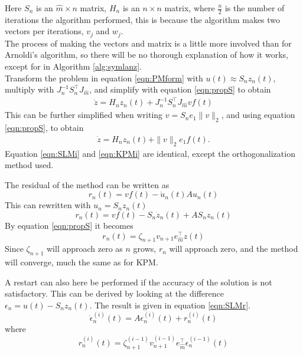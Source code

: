 Here $S_n$ is an $\hat{m} \times n $ matrix, $H_n$ is an $ n \times n $ matrix, where $\frac{n}{2}$ is the number of iterations the algorithm performed, this is because the algorithm makes two vectors per iterations, $v_j$ and $w_j$. \\

The process of making the vectors and matrix is a little more involved than for Arnoldi's algorithm, so there will be no thorough explanation of how it works, except for in Algorithm \ref{alg:symlanz}.\\

Transform the problem in equation \eqref{eqn:PMform} with $u(t) \approx S_n z_n(t)$, multiply with $J^{-1}_n S_n^\top J_{ \hat{m} }$, and simplify with equation \eqref{eqn:propS} to obtain
\begin{equation}
\begin{aligned}
\dot{z} = H_n z_n(t) + J_n^{-1} S_n^\top J_{\hat{m}} v f(t)
\end{aligned}
\label{eqn:SLMi}
\end{equation}
This can be further simplified when writing $ v = S_n e_1 \| v \|_2 $, and using equation \eqref{eqn:propS}, to obtain
\begin{equation}
\begin{aligned}
\dot{z} = H_n z_n(t) + \|v \|_2 e_1 f(t).
\end{aligned}
\label{eqn:SLMi}
\end{equation}
Equation \eqref{eqn:SLMi} and \eqref{eqn:KPMi} are identical, except the orthogonalization method used. 

The residual of the method can be written as
\begin{equation}
r_n(t) = v f(t) - \dot{u}_n(t) A u_n(t)
\end{equation}
This can rewritten with $u_n = S_n z_n(t)$
\begin{equation}
r_n(t) = v f(t) -S_n \dot{z}_n(t) + A S_n z_n(t)
\end{equation}
By equation \eqref{eqn:propS} it becomes
\begin{equation}
r_n(t) =  \zeta_{n+1} v_{n+1} e_{\hat{m}}^\top z(t)
\end{equation}
Since $\zeta_{n+1}$ will approach zero as $n$ grows, $r_n$ will approach zero, and the method will converge, much the same as for KPM. 

A restart can also here be performed if the accuracy of the solution is not satisfactory. This can be derived by looking at the difference $ \epsilon_n = u(t) - S_n z_n(t)$. The result is given in equation \eqref{eqn:SLMr}. 
\begin{equation}
\dot{\epsilon}_n^{(i)}(t) = A \epsilon_n^{(i)}(t) + r_n^{(i)}(t)
\end{equation}
where
\begin{equation}
r_n^{(i)}(t) = \zeta_{n+1}^{(i-1)} v_{n+1}^{(i-1)} e_{\hat{m}}^\top \epsilon_n^{(i-1)}(t)
\end{equation}

